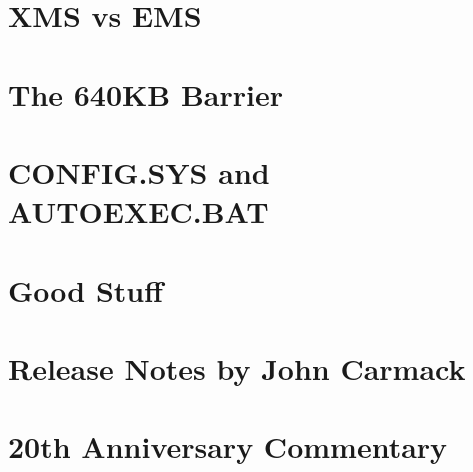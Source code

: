 \documentclass[8pt]{book}
\newcommand\blankpage{%
    \null
    \thispagestyle{empty}%
    \addtocounter{page}{-1}%
    \newpage}
\begin{document}
    \chapter{XMS vs EMS} 
          
    \chapter{The 640KB Barrier}\label{chap:barrier640}
        
    \chapter{CONFIG.SYS and AUTOEXEC.BAT}
         
    \chapter{Good Stuff}
          
    \chapter{Release Notes by John Carmack}
        
    \chapter{20th Anniversary Commentary}
        

    \ifx\forprint\undefined   
      
\else
    \pagestyle{empty}

    \blankpage      
    \blankpage 
    \blankpage
\fi
\end{document}
